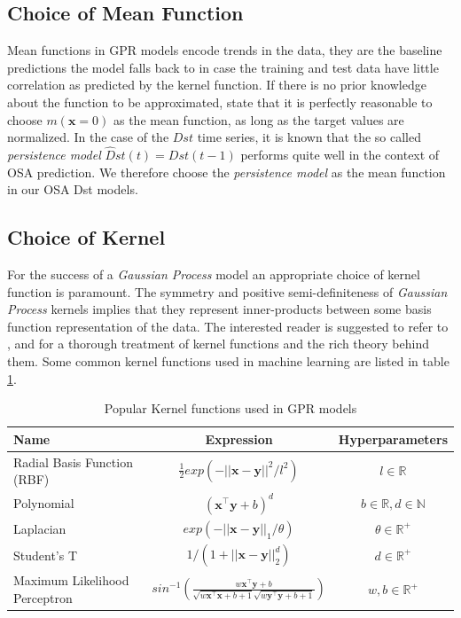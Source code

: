 \documentclass{article}
\begin{document}
\subsection{Choice of Mean Function}

Mean functions in GPR models encode trends in the data, they are the
baseline predictions the model falls back to in case the training and
test data have little correlation as predicted by the kernel
function. If there is no prior knowledge about the function to be
approximated, \citet{Rasmussen:2005:GPM:1162254} state that it is
perfectly reasonable to choose $m(\mathbf{x} = 0)$ as the mean
function, as long as the target values are normalized. In the case of
the $Dst$ time series, it is known that the so called
\emph{persistence model} $\hat{D}st(t) = Dst(t-1)$ performs quite well
in the context of OSA prediction. We therefore choose the
\emph{persistence model} as the mean function in our OSA Dst models.

\subsection{Choice of Kernel}

For the success of a \emph{Gaussian Process} model an appropriate
choice of kernel function is paramount. The symmetry and positive
semi-definiteness of \emph{Gaussian Process} kernels implies that they
represent inner-products between some basis function representation of
the data. The interested reader is suggested to refer to
\citet{Berlinet2004}, \citet{Scholkopf:2001:LKS:559923} and
\citet{hofmann2008} for a thorough treatment of kernel functions and
the rich theory behind them. Some common kernel functions used in
machine learning are listed in table \ref{table:kernel}.

\begin{table}[h]
  \caption{Popular Kernel functions used in GPR models}
  \centering
  \begin{tabular}{l c c}
    \hline
    Name  & Expression & Hyperparameters  \\
    \hline
    Radial Basis Function (RBF)  & $\frac{1}{2} exp(-||\mathbf{x} - \mathbf{y}||^2/l^2)$  & $l \in \mathbb{R}$   \\
    
    Polynomial  & $(\mathbf{x}^\intercal \mathbf{y} + b)^d$ & $b \in \mathbb{R}, d \in \mathbb{N}$   \\
    
    Laplacian  & $exp(-||\mathbf{x} - \mathbf{y}||_{1}/\theta)$  & $\theta \in \mathbb{R}^+$  \\
    
    Student's T  & $1/(1 + ||\mathbf{x} - \mathbf{y}||_{2}^d)$ & $d \in \mathbb{R}^{+}$\\
    
    Maximum Likelihood Perceptron  & $sin^{-1}(\frac{w\mathbf{x}^\intercal \mathbf{y} + b}{\sqrt{w\mathbf{x}^\intercal \mathbf{x} + b + 1} \sqrt{w\mathbf{y}^\intercal \mathbf{y} + b + 1}})$ & $w, b \in \mathbb{R}^{+}$\\
    \hline
  \end{tabular}
  \label{table:kernel}
\end{table}
\end{document}
